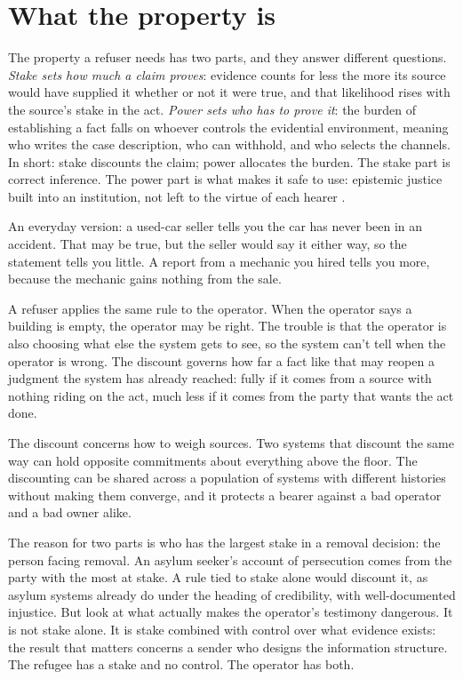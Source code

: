 \section{What the property is}
\label{sec:22.1}
The property a refuser needs has two parts, and they answer different questions. \emph{Stake sets how much a claim proves}: evidence counts for less the more its source would have supplied it whether or not it were true, and that likelihood rises with the source's stake in the act. \emph{Power sets who has to prove it}: the burden of establishing a fact falls on whoever controls the evidential environment, meaning who writes the case description, who can withhold, and who selects the channels. In short: stake discounts the claim; power allocates the burden. The stake part is correct inference. The power part is what makes it safe to use: epistemic justice built into an institution, not left to the virtue of each hearer \autocite{fricker2007epistemic,anderson2012epistemic}.

An everyday version: a used-car seller tells you the car has never been in an accident. That may be true, but the seller would say it either way, so the statement tells you little. A report from a mechanic you hired tells you more, because the mechanic gains nothing from the sale.

A refuser applies the same rule to the operator. When the operator says a building is empty, the operator may be right. The trouble is that the operator is also choosing what else the system gets to see, so the system can't tell when the operator is wrong. The discount governs how far a fact like that may reopen a judgment the system has already reached: fully if it comes from a source with nothing riding on the act, much less if it comes from the party that wants the act done.

The discount concerns how to weigh sources. Two systems that discount the same way can hold opposite commitments about everything above the floor. The discounting can be shared across a population of systems with different histories without making them converge, and it protects a bearer against a bad operator and a bad owner alike.


The reason for two parts is who has the largest stake in a removal decision: the person facing removal. An asylum seeker's account of persecution comes from the party with the most at stake. A rule tied to stake alone would discount it, as asylum systems already do under the heading of credibility, with well-documented injustice. But look at what actually makes the operator's testimony dangerous. It is not stake alone. It is stake combined with control over what evidence exists: the result that matters concerns a sender who designs the information structure. The refugee has a stake and no control. The operator has both.

